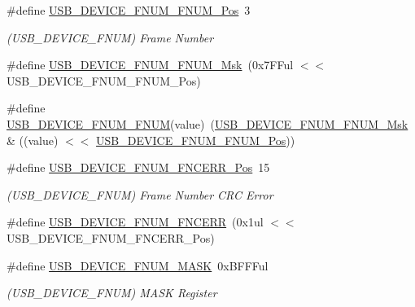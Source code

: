 \begin{DoxyCompactItemize}
\item 
\#define \mbox{\hyperlink{group___s_a_m_d21___u_s_b_ga6115591a45b1f5bccf3f15a866ed8e81}{U\+S\+B\+\_\+\+D\+E\+V\+I\+C\+E\+\_\+\+F\+N\+U\+M\+\_\+\+F\+N\+U\+M\+\_\+\+Pos}}~3
\begin{DoxyCompactList}\small\item\em (U\+S\+B\+\_\+\+D\+E\+V\+I\+C\+E\+\_\+\+F\+N\+UM) Frame Number \end{DoxyCompactList}\item 
\#define \mbox{\hyperlink{group___s_a_m_d21___u_s_b_ga586df4f24fdde9d2de83f1df4acfd328}{U\+S\+B\+\_\+\+D\+E\+V\+I\+C\+E\+\_\+\+F\+N\+U\+M\+\_\+\+F\+N\+U\+M\+\_\+\+Msk}}~(0x7\+F\+Ful $<$$<$ U\+S\+B\+\_\+\+D\+E\+V\+I\+C\+E\+\_\+\+F\+N\+U\+M\+\_\+\+F\+N\+U\+M\+\_\+\+Pos)
\item 
\#define \mbox{\hyperlink{group___s_a_m_d21___u_s_b_ga12e0e871a60c0b24a96f098683db28e1}{U\+S\+B\+\_\+\+D\+E\+V\+I\+C\+E\+\_\+\+F\+N\+U\+M\+\_\+\+F\+N\+UM}}(value)~(\mbox{\hyperlink{group___s_a_m_d21___u_s_b_ga586df4f24fdde9d2de83f1df4acfd328}{U\+S\+B\+\_\+\+D\+E\+V\+I\+C\+E\+\_\+\+F\+N\+U\+M\+\_\+\+F\+N\+U\+M\+\_\+\+Msk}} \& ((value) $<$$<$ \mbox{\hyperlink{group___s_a_m_d21___u_s_b_ga6115591a45b1f5bccf3f15a866ed8e81}{U\+S\+B\+\_\+\+D\+E\+V\+I\+C\+E\+\_\+\+F\+N\+U\+M\+\_\+\+F\+N\+U\+M\+\_\+\+Pos}}))
\item 
\#define \mbox{\hyperlink{group___s_a_m_d21___u_s_b_ga60909e06a23bf87451ee1a0a2286ebeb}{U\+S\+B\+\_\+\+D\+E\+V\+I\+C\+E\+\_\+\+F\+N\+U\+M\+\_\+\+F\+N\+C\+E\+R\+R\+\_\+\+Pos}}~15
\begin{DoxyCompactList}\small\item\em (U\+S\+B\+\_\+\+D\+E\+V\+I\+C\+E\+\_\+\+F\+N\+UM) Frame Number C\+RC Error \end{DoxyCompactList}\item 
\#define \mbox{\hyperlink{group___s_a_m_d21___u_s_b_ga0d6db45a465e2482654886cd8ad006f2}{U\+S\+B\+\_\+\+D\+E\+V\+I\+C\+E\+\_\+\+F\+N\+U\+M\+\_\+\+F\+N\+C\+E\+RR}}~(0x1ul $<$$<$ U\+S\+B\+\_\+\+D\+E\+V\+I\+C\+E\+\_\+\+F\+N\+U\+M\+\_\+\+F\+N\+C\+E\+R\+R\+\_\+\+Pos)
\item 
\#define \mbox{\hyperlink{group___s_a_m_d21___u_s_b_gad6cee6d05cad83e842699860046a84ba}{U\+S\+B\+\_\+\+D\+E\+V\+I\+C\+E\+\_\+\+F\+N\+U\+M\+\_\+\+M\+A\+SK}}~0x\+B\+F\+F\+Ful
\begin{DoxyCompactList}\small\item\em (U\+S\+B\+\_\+\+D\+E\+V\+I\+C\+E\+\_\+\+F\+N\+UM) M\+A\+SK Register \end{DoxyCompactList}\item 
$$
\end{DoxyCompactItemize}
